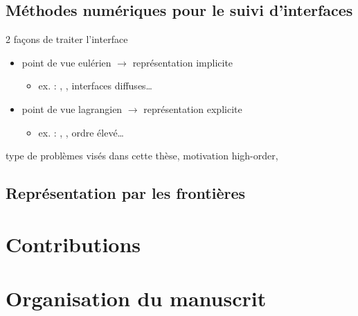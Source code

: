 \subsection*{Méthodes numériques pour le suivi d'interfaces}
2 façons de traiter l'interface
\begin{itemize}
	\item point de vue eulérien $\to$ représentation implicite
	\begin{itemize}
		\item ex. : , , interfaces diffuses\ldots
	\end{itemize}
	\item point de vue lagrangien $\to$ représentation explicite
	\begin{itemize}
		\item ex. : , , ordre élevé\ldots
	\end{itemize}
\end{itemize}

type de problèmes visés dans cette thèse, motivation high-order, \brep
\subsection*{Représentation par les frontières}


\section*{Contributions}%


\section*{Organisation du manuscrit}